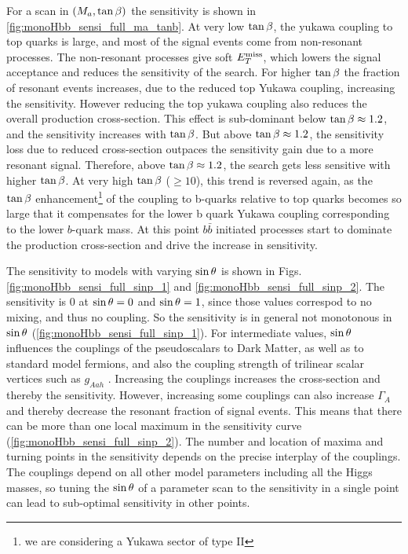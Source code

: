 For a scan in $(M_{a},\tan\beta)$ the sensitivity is shown in  \autoref{fig:monoHbb_sensi_full_ma_tanb}. 
At very low $\tan\beta$, the yukawa coupling to top quarks is large, and most of the signal events come from non-resonant processes. %
The non-resonant processes give soft $E_T^\mathrm{miss}$, which lowers the signal acceptance and reduces the sensitivity of the search.
For higher $\tan\beta$ the fraction of resonant events increases, due to the reduced top Yukawa coupling, increasing the sensitivity.
However reducing the top yukawa coupling also reduces the overall production cross-section. 
This effect is sub-dominant below $\tan\beta \approx 1.2$, and the sensitivity increases with $\tan\beta$. 
But above $\tan\beta \approx 1.2$, the sensitivity loss due to reduced cross-section outpaces the sensitivity gain due to a more resonant signal.
Therefore, above $\tan\beta \approx 1.2$, the search gets less sensitive with higher $\tan\beta$.
At very high $\tan\beta$ ($\geq 10$), this trend is reversed again, as the $\tan\beta$ enhancement\footnote{we are considering a Yukawa sector of type II} of the 
coupling to b-quarks relative to top quarks becomes so large that it compensates for the lower b quark Yukawa coupling 
corresponding to the lower $b$-quark mass.
At this point $b\bar{b}$ initiated processes start to dominate the production cross-section and drive the increase in sensitivity.

The sensitivity to models with varying $\sin\theta$ is shown in Figs. \ref{fig:monoHbb_sensi_full_sinp_1} and \ref{fig:monoHbb_sensi_full_sinp_2}.
The sensitivity is $0$ at $\sin\theta=0$ and $\sin\theta=1$, since those values correspod to no mixing, and thus no coupling.
So the sensitivity is in general not monotonous in $\sin\theta$ (\autoref{fig:monoHbb_sensi_full_sinp_1}).
For intermediate values, $\sin\theta$ influences the couplings of the pseudoscalars to  Dark Matter, as well as to standard model fermions, 
and also the coupling strength of trilinear scalar vertices such as $g_{Aah}$ \cite{Bauer:2017ota}. 
Increasing the couplings increases the cross-section and thereby the sensitivity.
However, increasing some couplings can also increase $\Gamma_A$ and thereby decrease the resonant fraction of signal events.
This means that there can be more than one local maximum in the sensitivity curve (\autoref{fig:monoHbb_sensi_full_sinp_2}).
The number and location  of maxima and turning points in the sensitivity  depends on the precise interplay of the couplings.
The couplings depend on all other model parameters including all the Higgs masses, 
so tuning the $\sin\theta$ of a parameter scan to the sensitivity in a single point can lead to sub-optimal sensitivity in other points.

